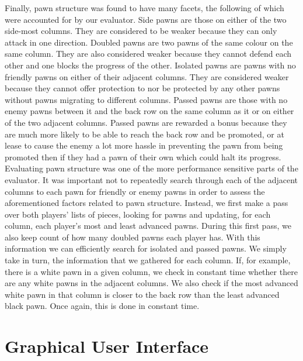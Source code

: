 \documentclass{l3proj}
\begin{document}
Finally, pawn structure was found to have many facets, the following of which were accounted for by our evaluator. Side pawns are those on either of the two side-most columns. They are considered to be weaker because they can only attack in one direction. Doubled pawns are two pawns of the same colour on the same column. They are also considered weaker because they cannot defend each other and one blocks the progress of the other. Isolated pawns are pawns with no friendly pawns on either of their adjacent columns. They are considered weaker because they cannot offer protection to nor be protected by any other pawns without pawns migrating to different columns. Passed pawns are those with no enemy pawns between it and the back row on the same column as it or on either of the two adjacent columns. Passed pawns are rewarded a bonus because they are much more likely to be able to reach the back row and be promoted, or at lease to cause the enemy a lot more hassle in preventing the pawn from being promoted then if they had a pawn of their own which could halt its progress. \\

Evaluating pawn structure was one of the more performance sensitive parts of the evaluator. It was important not to repeatedly search through each of the adjacent columns to each pawn for friendly or enemy pawns in order to assess the aforementioned factors related to pawn structure. Instead, we first make a pass over both players’ lists of pieces, looking for pawns and updating, for each column, each player’s most and least advanced pawns. During this first pass, we also keep count of how many doubled pawns each player has. With this information we can efficiently search for isolated and passed pawns. We simply take in turn, the information that we gathered for each column. If, for example, there is a white pawn in a given column, we check in constant time whether there are any white pawns in the adjacent columns. We also check if the most advanced white pawn in that column is closer to the back row than the least advanced black pawn. Once again, this is done in constant time. \\

\section{Graphical User Interface}
\end{document}

